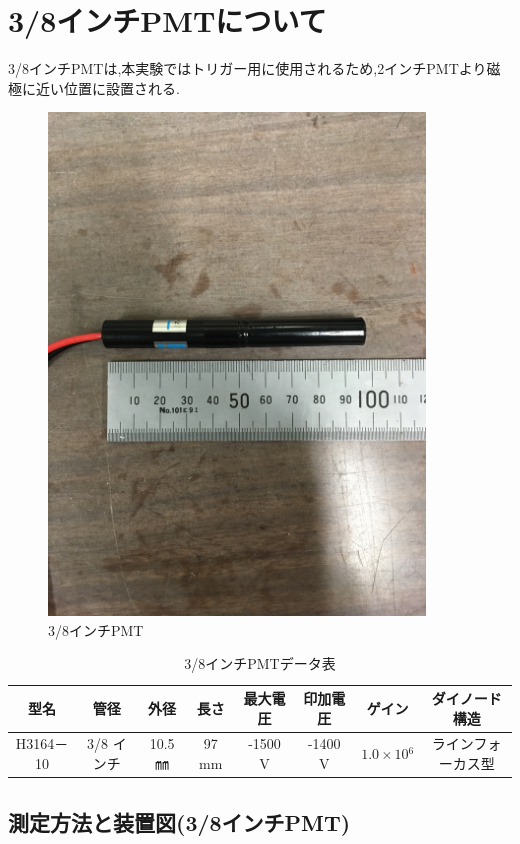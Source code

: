 \section{3/8インチPMTについて}
3/8インチPMTは,本実験ではトリガー用に使用されるため,2インチPMTより磁極に近い位置に設置される.
\begin{figure}[H]
	\centering
		\includegraphics[width=10cm]{fig/iguchi/miniPMT.jpg}
	\caption{3/8インチPMT}
	\label{3/8inch}
\end{figure}
\begin{table}[htb]
	\centering
	
	  \begin{tabular}{cccccccc} \hline
		型名& 管径 & 外径 & 長さ & 最大電圧 & 印加電圧 & ゲイン & ダイノード構造 \\ \hline \hline
		H3164－10 & 3/8 インチ & 10.5 ㎜ & 97 mm & -1500 V & -1400 V & $1.0\times10{^{6}}$ &ラインフォーカス型 \\ \hline
	\end{tabular}
	  \caption{3/8インチPMTデータ表}
\end{table}


\subsection{測定方法と装置図(3/8インチPMT)}

